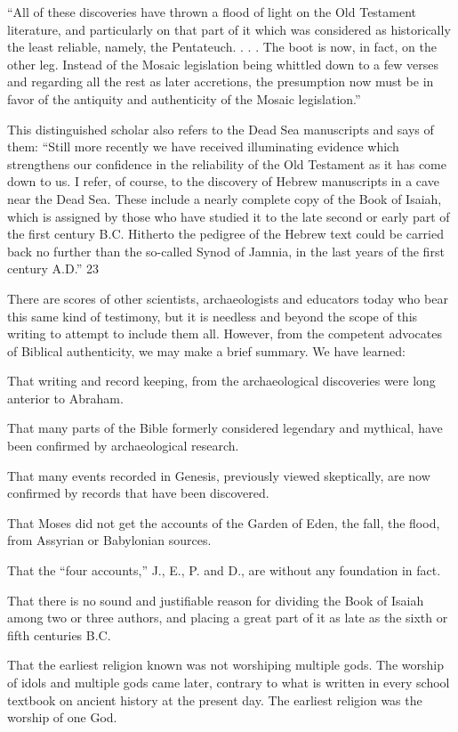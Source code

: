 ``All of these discoveries have thrown a flood of light on the Old Testament literature, and
particularly on that part of it which was considered as historically the least reliable, namely,
the Pentateuch. . . . The boot is now, in fact, on the other leg. Instead of the Mosaic
legislation being whittled down to a few verses and regarding all the rest as later accretions,
the presumption now must be in favor of the antiquity and authenticity of the Mosaic
legislation.''

This distinguished scholar also refers to the Dead Sea manuscripts and says of them: ``Still
more recently we have received illuminating evidence which strengthens our confidence in
the reliability of the Old Testament as it has come down to us. I refer, of course, to the
discovery of Hebrew manuscripts in a cave near the Dead Sea. These include a nearly
complete copy of the Book of Isaiah, which is assigned by those who have studied it to the
late second or early part of the first century B.C. Hitherto the pedigree of the Hebrew text
could be carried back no further than the so-called Synod of Jamnia, in the last years of the
first century A.D.'' 23

There are scores of other scientists, archaeologists and educators today who bear this same
kind of testimony, but it is needless and beyond the scope of this writing to attempt to include
them all. However, from the competent advocates of Biblical authenticity, we may make a
brief summary. We have learned:

That writing and record keeping, from the archaeological discoveries were long anterior to
Abraham.

That many parts of the Bible formerly considered legendary and mythical, have been
confirmed by archaeological research.

That many events recorded in Genesis, previously viewed skeptically, are now confirmed by
records that have been discovered.

That Moses did not get the accounts of the Garden of Eden, the fall, the flood, from Assyrian
or Babylonian sources.

That the ``four accounts,'' J., E., P. and D., are without any foundation in fact.

That there is no sound and justifiable reason for dividing the Book of Isaiah among two or
three authors, and placing a great part of it as late as the sixth or fifth centuries B.C.

That the earliest religion known was not worshiping multiple gods. The worship of idols and
multiple gods came later, contrary to what is written in every school textbook on ancient
history at the present day. The earliest religion was the worship of one God.

